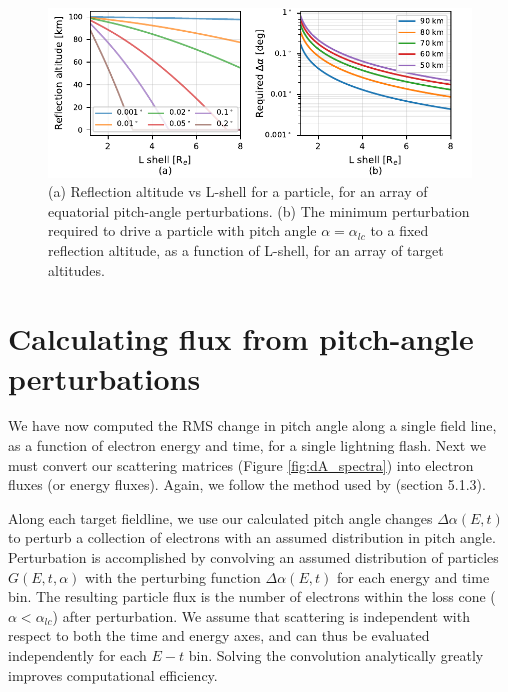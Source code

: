 \begin{figure}[t]
\begin{center}
\includegraphics{figures/pitch_angle_vs_depth.pdf}
\caption[Reflection altitudes vs L-shell for a set of pitch angle perturbations]{(a) Reflection altitude vs L-shell for a particle, for an array of equatorial pitch-angle perturbations. (b) The minimum perturbation required to drive a particle with pitch angle $\alpha = \alpha_{lc}$ to a fixed reflection altitude, as a function of L-shell, for an array of target altitudes.}
\label{fig:pitch_angle_vs_altitude}
\end{center}
\end{figure}


\section{Calculating flux from pitch-angle perturbations}
\label{section:flux_from_pitch_angle}
We have now computed the RMS change in pitch angle along a single field line, as a function of electron energy and time, for a single lightning flash. Next we must convert our scattering matrices (Figure \ref{fig:dA_spectra}) into electron fluxes (or energy fluxes). Again, we follow the method used by \cite{Bortnik2005} (section 5.1.3).

Along each target fieldline, we use our calculated pitch angle changes $\Delta \alpha(E,t)$ to perturb a collection of electrons with an assumed distribution in pitch angle. Perturbation is accomplished by convolving an assumed distribution of particles $G(E,t,\alpha)$ with the perturbing function $\Delta \alpha(E,t)$ for each energy and time bin. The resulting particle flux is the number of electrons within the loss cone ($\alpha < \alpha_{lc}$) after perturbation. We assume that scattering is independent with respect to both the time and energy axes, and can thus be evaluated independently for each $E-t$ bin. Solving the convolution analytically greatly improves computational efficiency.

